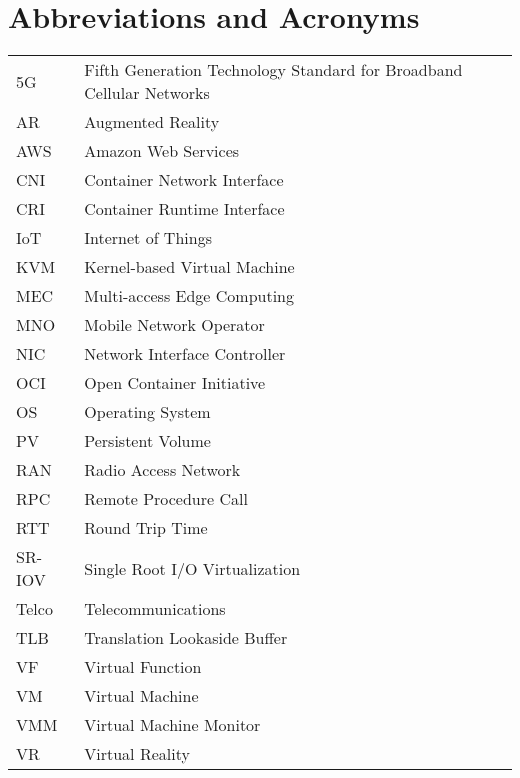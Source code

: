 \chapter*{Abbreviations and Acronyms}

\noindent
\begin{longtable}{@{}p{}p{}@{}}
5G & Fifth Generation Technology Standard for Broadband Cellular Networks \\
AR & Augmented Reality \\
AWS & Amazon Web Services \\
CNI & Container Network Interface \\
CRI & Container Runtime Interface \\
IoT & Internet of Things \\
KVM & Kernel-based Virtual Machine \\
MEC & Multi-access Edge Computing \\
MNO & Mobile Network Operator \\
NIC & Network Interface Controller \\
OCI & Open Container Initiative \\
OS & Operating System \\
PV & Persistent Volume \\
RAN & Radio Access Network \\
RPC & Remote Procedure Call \\
RTT & Round Trip Time \\
SR-IOV & Single Root I/O Virtualization \\
Telco & Telecommunications \\
TLB & Translation Lookaside Buffer \\
VF & Virtual Function \\
VM & Virtual Machine \\
VMM & Virtual Machine Monitor \\
VR & Virtual Reality\\
\end{longtable}
